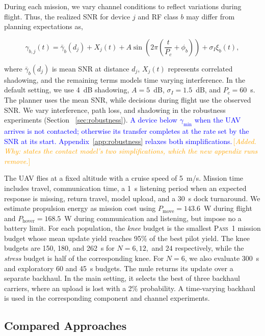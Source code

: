 \documentclass[conference]{IEEEtran}
\newcommand{\changenote}[1]{\textcolor{orange}{\,[\emph{#1}]}}
\begin{document}
During each mission, we vary channel conditions to reflect variations during flight. Thus, the realized SNR for device 
 \(j\)  and RF class 
\(b\) may differ from planning expectations as,

\begin{equation}
\gamma_{b,j}(t)
=
\bar{\gamma}_{b}(d_j)
+
X_j(t)
+
A\sin\!\left(2\pi\left(\frac{t}{P_c}+\phi_b\right)\right)
+
\sigma_I\xi_b(t),
\label{eq:channel-model}
\end{equation}

where \(\bar{\gamma}_{b}(d_j)\) is mean SNR at distance \(d_j\),
\(X_j(t)\) represents correlated shadowing, and the remaining terms models
time varying interference. In the default setting, we use 4~dB shadowing,
\(A=5\)~dB, \(\sigma_I=1.5\)~dB, and \(P_c=60\)~s. The planner uses the
mean SNR, while decisions during flight use the observed SNR. We vary
interference, path loss, and shadowing in the robustness experiments (Section ~\ref{sec:robustness}).
\textcolor{blue}{A device below $\gamma_{\min}$ when the UAV arrives is not
contacted; otherwise its transfer completes at the rate set by the SNR at its
start. Appendix~\ref{app:robustness} relaxes both simplifications.}\changenote{Added. Why: states the contact model's two simplifications, which the new appendix runs remove.}

The UAV flies at a fixed altitude with a cruise speed of 5~m/s. Mission time
includes travel, communication time, a 1~s listening period when an expected
response is missing, return travel, model upload, and a 30~s dock turnaround.
We estimate propulsion energy as mission cost using
\(P_{\mathrm{move}}=143.6\)~W during flight and
\(P_{\mathrm{hover}}=168.5\)~W during communication and listening, but impose no a battery limit. For each population, the \emph{knee} budget is the smallest \textsc{Pass~1} mission
budget whose mean update yield reaches 95\% of the best pilot yield. The knee
budgets are 150, 180, and 262~s for \(N=6,12,\) and \(24\) respectively, while the
\emph{stress} budget is half of the corresponding knee. For \(N=6\), we also
evaluate 300~s and exploratory 60 and 45~s budgets. The mule returns its update over a separate backhaul. In the main setting, it
selects the best of three backhaul carriers, where an upload is lost with a 2\% probability. A
time-varying backhaul is used in the corresponding component and channel
experiments.

\subsection{Compared Approaches}
\label{sec:baselines}
\end{document}
